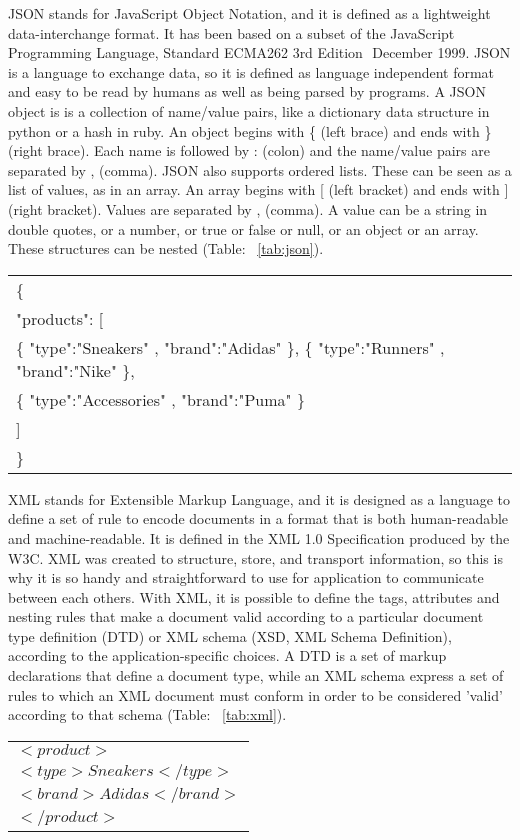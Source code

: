 JSON stands for JavaScript Object Notation, and it is defined as a lightweight data-interchange format. It has been based on a subset of the JavaScript Programming Language, Standard ECMA­262 3rd Edition ­ December 1999. JSON is a language to exchange data, so it is defined as language independent format and easy to be read by humans as well as being parsed by programs. A JSON object is is a collection of name/value pairs, like a dictionary data structure in python or a hash in ruby. An object begins with \{ (left brace) and ends with \} (right brace). Each name is followed by : (colon) and the name/value pairs are separated by , (comma). JSON also supports ordered lists. These can be seen as a list of values, as in an array. An array begins with [ (left bracket) and ends with ] (right bracket). Values are separated by , (comma). A value can be a string in double quotes, or a number, or true or false or null, or an object or an array. These structures can be nested (Table: ~\ref{tab:json}).

\begin{table*}[ht]
\centering
\begin{tabular}{| l |}
\hline
\{\\
"products": [\\
\{ "type":"Sneakers" , "brand":"Adidas" \}, \{ "type":"Runners" , "brand":"Nike" \},\\
\{ "type":"Accessories" , "brand":"Puma" \}\\
]\\ \}\\
\hline
\end{tabular}
\caption{A JSON example}
\label{tab:json}
\end{table*}

XML stands for Extensible Markup Language, and it is designed as a language to define a set of rule to encode documents in a format that is both human-readable and machine-­readable. It is defined in the XML 1.0 Specification produced by the W3C. XML was created to structure, store, and transport information, so this is why it is so handy and straightforward to use for application to communicate between each others. With XML, it is possible to define the tags, attributes and nesting rules that make a document valid according to a particular document type definition (DTD) or XML schema (XSD, XML Schema Definition), according to the application­-specific choices. A DTD is a set of markup declarations that define a document type, while an XML schema express a set of rules to which an XML document must conform in order to be considered 'valid' according to that schema (Table: ~\ref{tab:xml}).
\\
\begin{table*}[ht]
\centering
\begin{tabular}{| l |}
\hline
$<product>$\\
  $<type>Sneakers</type>$\\
  $<brand>Adidas</brand>$\\
$</product>$\\
\hline
\end{tabular}
\caption{An XML example}
\label{tab:xml}
\end{table*}


